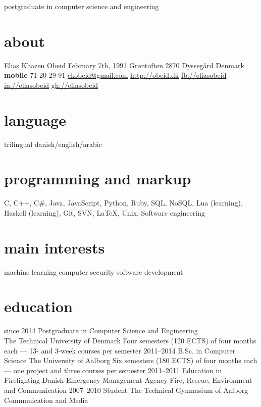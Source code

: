 \documentclass[]{friggeri-cv}
\begin{document}
    {postgraduate in computer science and engineering}

\begin{aside}
  \section{about}
    Elias Khazen Obeid
    February 7th, 1991
    Grøntoften 
    2870 Dyssegård
    Denmark
    ~
    \textbf{mobile} 71 20 29 91
    \href{mailto:ekobeid@gmail.com}{ekobeid@gmail.com}
    \href{http://obeid.dk}{http://obeid.dk}
    \href{https://www.facebook.com/eliaskhazenobeid}{fb://eliasobeid}
    \href{https://www.linkedin.com/in/eliasobeid}{in://eliasobeid}
    \href{https://github.com/Obeyed}{gh://eliasobeid}
  \section{language}
    trilingual danish/english/arabic
  \section{programming and markup}
    C, C++, C\#, Java, JavaScript, Python, Ruby, SQL, NoSQL,
    Lua (learning), 
    Haskell (learning),
    Git, SVN, \LaTeX{}, Unix,
    Software engineering
  \section{main interests}
    machine learning
    computer security
    software development
\end{aside}

\section{education}

\begin{entrylist}
  \entry
    {since 2014}
    {Postgraduate {\normalfont in Computer Science and Engineering}\\}
    {The Technical University of Denmark}
    {Four semesters (120 ECTS) of four months each --- 13- and 3-week courses per semester}
  \entry
    {2011–2014}
    {B.Sc. {\normalfont in Computer Science}}
    {The University of Aalborg}
    {Six semesters (180 ECTS) of four months each --- one project and three courses per semester}
  \entry
    {2011–2011}
    {Education in Firefighting}
    {Danish Emergency Management Agency}
    {Fire, Rescue, Environment and Communication}
  \entry
    {2007–2010}
    {Student}
    {The Technical Gymnasium of Aalborg}
    {Communication and Media}
\end{entrylist}
\end{document}
